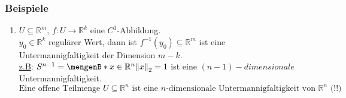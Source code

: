 \subsubsection{Beispiele} %
\label{ssub:beispiele}
\begin{enumerate}
	\item $U \subseteq \mathbb{R}^m$, $f: U \to \mathbb{R}^k $ eine $C^1$-Abbildung. \\
	$y_0 \in \mathbb{R}^k$ regulärer Wert, dann ist $f^{-1}(y_0) \subseteq \mathbb{R}^m$ ist eine Untermannigfaltigkeit der Dimension $m-k$. \\
	\underline{z.B}: $S^{n-1}= \set[x \in \mathbb{R}^n]{\norm{x}_2=1}$ ist eine $(n-1)-dimensionale$ Untermannigfaltigkeit. \\
	\[
		\text{Eine offene Teilmenge $U \subseteq \mathbb{R}^n$ ist eine $n$-dimensionale Untermannigfaltigkeit von $\mathbb{R}^n$ (!!)}
	\]
\end{enumerate}
\cleardoubleoddemptypage
{}
\setcounter{page}{1}
\printindex

	